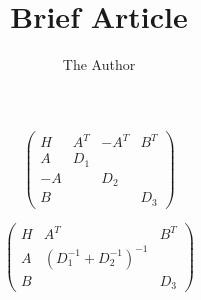 \documentclass[11pt, oneside]{article}   	%
\title{Brief Article}
\author{The Author}
\begin{document}
\maketitle

$$
\left( \begin{matrix} 
H & A^T & -A^T & B^T \\
A & D_1 & & \\
-A & & D_2 & \\
B &  & & D_{3}
\end{matrix}  \right)
$$


$$
\left( \begin{matrix} 
H & A^T & B^T \\
A & (D_1^{-1} + D_2^{-1})^{-1} & \\
B &  & D_{3}
\end{matrix}  \right)
$$
\end{document}

